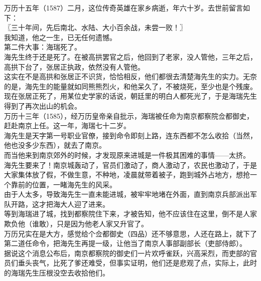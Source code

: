\begin{multicols}{\theparacolNo}
万历十五年（1587）二月，这位传奇英雄在家乡病逝，年六十岁。去世前留言如下：\\

〖三十年间，先后南北、水陆、大小百余战，未尝一败！〗\\

我知道，他之一生，已无任何遗憾。\\

第二件大事：海瑞死了。\\

海先生终于还是死了。在被高拱罢官之后，他回到了老家，没人管他，三年之后，高拱下台了，张居正执政，依然没有人管他。\\

这实在不是高拱和张居正不识货，恰恰相反，他们都很去清楚海先生的实力。无奈的是，海先生的能量就如同熊熊烈火，和他呆久了，不被烧死，至少也是个残废。\\

现在张居正死了，用某位史学家的话说，朝廷里的明白人都死光了，于是海瑞先生得到了再次出山的机会。\\

万历十三年（1585），经万历皇帝亲自批示，海瑞被任命为南京都察院佥都御史，赶赴南京上任。这一年，海瑞七十二岁。\\

海先生是天字第一号职业官僚，接到命令即刻上路，连东西都不怎么收拾（当然，他也没多少东西），就去了南京。\\

而当他来到南京郊外的时候，才发现原来进城是一件极其困难的事情——太挤。\\

海先生要来了！南京城轰动了，官员们激动了，商人激动了，农民也激动了，于是大家集体放了假，不做生意，不种地，凌晨就带着被子，跑到城外占地方，想抢一个靠前的位置，一睹海先生的风采。\\

由于人太多，导致海先生一直未能进城，被牢牢地堵在外面，直到南京兵部派出军队开路，这才把海大人迎了进来。\\

等到海瑞进了城，找到都察院住下来，才被告知，他不应该住在这里，倒不是人家欺负他（谁敢），只是因为他老人家又升官了。\\

万历兄实在是大方，感觉给个佥都御史（四品）还不够意思，人还在路上，就下了第二道任命令，把海先生再提一级，让他当了南京人事部副部长（吏部侍郎）。\\

据说这个消息公布后，南京都察院的御史们一片欢呼雀跃，兴高采烈，而吏部的官员们垂头丧气，比死了爹还难受，但事实证明，他们还是悲观了点，实际上，此时的海瑞先生压根没空去收拾他们。\\


\end{multicols}
